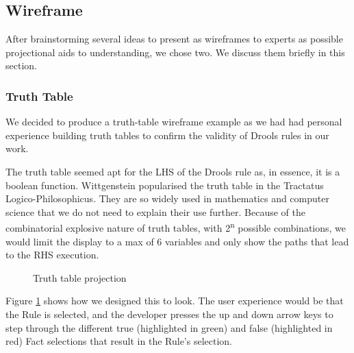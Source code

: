 \subsection{Wireframe}

After brainstorming several ideas to present as wireframes to experts as possible projectional aids to understanding, we chose two.
We discuss them briefly in this section.

\subsubsection{Truth Table}
We decided to produce a truth-table wireframe example as we had had personal experience building truth tables to confirm the validity of Drools rules in our work.

The truth table seemed apt for the LHS of the Drools rule as, in essence, it is a boolean function.
Wittgenstein popularised the truth table in the Tractatus Logico-Philosophicus\cite{wittgenstein2013tractatus}.
They are so widely used in mathematics and computer science that we do not need to explain their use further.
Because of the combinatorial explosive nature of truth tables, with 2\textsuperscript{n} possible combinations, we would limit the display to a max of 6 variables and only show the paths that lead to the RHS execution.

\begin{figure}[h]
    \centering
    \caption{Truth table projection}
    \label{fig:TruthTableProjection}
\end{figure}

Figure \ref{fig:TruthTableProjection} shows how we designed this to look.
The user experience would be that the Rule is selected, and the developer presses the up and down arrow keys to step through the different true (highlighted in green) and false (highlighted in red) Fact selections that result in the Rule's selection.

